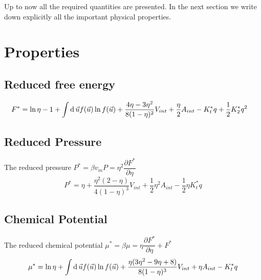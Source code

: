 Up to now all the required quantities are presented. In the next section we write down explicitly all the important physical properties.

\section{Properties}
\subsection{Reduced free energy}
\begin{equation}
	\begin{split}
	F^*&=\ln\eta -1+\int\operatorname{d}\vec{u}f(\vec{u})\ln f(\vec{u})+\frac{4\eta-3\eta^2}{8(1-\eta)^2}V_{int}+\frac{\eta}{2}A_{int}-K_t^*q+\frac{1}{2}K_2^*q^2
	\end{split}
\end{equation}

\subsection{Reduced Pressure}
The reduced pressure $P^*=\beta v_m P=\eta^2\dfrac{\partial F^*}{\partial\eta}$
\begin{equation}
	P^* = \eta + \frac{\eta^2(2-\eta)}{4(1-\eta)^3}V_{int}+\frac{1}{2}\eta^2A_{int}-\frac{1}{2}\eta K_t^*q
\end{equation}

\subsection{Chemical Potential}
The reduced chemical potential $\mu^*=\beta\mu=\eta\dfrac{\partial F^*}{\partial\eta}+F^*$
\begin{equation}
	\mu^*=\ln\eta+\int\operatorname{d}\vec{u}f(\vec{u})\ln f(\vec{u})+\frac{\eta(3\eta^2-9\eta+8)}{8(1-\eta)^3}V_{int}+\eta A_{int}-K_t^*q
\end{equation}

